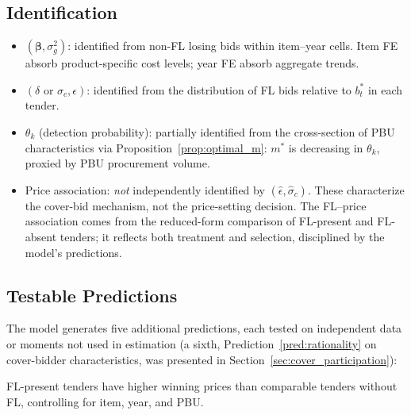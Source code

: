 
\subsection{Identification}
\label{sec:identification}

\begin{itemize}
  \item $(\boldsymbol{\beta}, \sigma_g^2)$: identified from non-FL
    losing bids within item--year cells. Item FE absorb
    product-specific cost levels; year FE absorb aggregate trends.

  \item $(\delta \text{ or } \sigma_c, \epsilon)$: identified from
    the distribution of FL bids relative to $b^*_t$ in each tender.

  \item $\theta_k$ (detection probability): partially identified from
    the cross-section of PBU characteristics via
    Proposition~\ref{prop:optimal_m}: $m^*$ is decreasing in
    $\theta_k$, proxied by PBU procurement volume.

  \item Price association: \emph{not} independently identified by
    $(\hat{\epsilon}, \hat{\sigma}_c)$. These characterize the
    cover-bid mechanism, not the price-setting decision. The
    FL--price association comes from the reduced-form comparison of
    FL-present and FL-absent tenders; it reflects both treatment
    and selection, disciplined by the model's predictions.
\end{itemize}


\subsection{Testable Predictions}
\label{sec:predictions}

The model generates five additional predictions, each tested on
independent data or moments not used in estimation (a sixth,
Prediction~\ref{pred:rationality} on cover-bidder characteristics,
was presented in Section~\ref{sec:cover_participation}):

\begin{prediction}
\label{pred:price}
FL-present tenders have higher winning prices than comparable tenders
without FL, controlling for item, year, and PBU.
\end{prediction}

